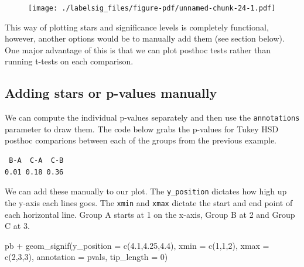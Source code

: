 \documentclass[
  letterpaper,
  DIV=11,
  numbers=noendperiod]{scrreprt}
\newenvironment{Shaded}{\begin{snugshade}}{\end{snugshade}}
\newcommand{\AttributeTok}[1]{\textcolor[rgb]{0.40,0.45,0.13}{#1}}
\newcommand{\DecValTok}[1]{\textcolor[rgb]{0.68,0.00,0.00}{#1}}
\newcommand{\FloatTok}[1]{\textcolor[rgb]{0.68,0.00,0.00}{#1}}
\newcommand{\FunctionTok}[1]{\textcolor[rgb]{0.28,0.35,0.67}{#1}}
\newcommand{\NormalTok}[1]{\textcolor[rgb]{0.00,0.23,0.31}{#1}}
\newcommand{\OtherTok}[1]{\textcolor[rgb]{0.00,0.23,0.31}{#1}}
\newcommand{\SpecialCharTok}[1]{\textcolor[rgb]{0.37,0.37,0.37}{#1}}
\begin{document}
\begin{figure}[H]

{\centering \texttt{[image: ./labelsig\_files/figure-pdf/unnamed-chunk-24-1.pdf]}

}

\end{figure}

This way of plotting stars and significance levels is completely
functional, however, another options would be to manually add them (see
section below). One major advantage of this is that we can plot posthoc
tests rather than running t-tests on each comparison.

\hypertarget{adding-stars-or-p-values-manually}{%
\subsection{\texorpdfstring{\textbf{Adding stars or p-values
manually}}{Adding stars or p-values manually}}\label{adding-stars-or-p-values-manually}}

We can compute the individual p-values separately and then use the
\texttt{annotations} parameter to draw them. The code below grabs the
p-values for Tukey HSD posthoc comparions between each of the groups
from the previous example.

\begin{Shaded}
\end{Shaded}

\begin{verbatim}
 B-A  C-A  C-B 
0.01 0.18 0.36 
\end{verbatim}

We can add these manually to our plot. The \texttt{y\_position} dictates
how high up the y-axis each lines goes. The \texttt{xmin} and
\texttt{xmax} dictate the start and end point of each horizontal line.
Group A starts at 1 on the x-axis, Group B at 2 and Group C at 3.

\begin{Shaded}
\begin{Highlighting}[]
\NormalTok{pb }\SpecialCharTok{+} 
  \FunctionTok{geom\_signif}\NormalTok{(}\AttributeTok{y\_position =} \FunctionTok{c}\NormalTok{(}\FloatTok{4.1}\NormalTok{,}\FloatTok{4.25}\NormalTok{,}\FloatTok{4.4}\NormalTok{), }
              \AttributeTok{xmin =} \FunctionTok{c}\NormalTok{(}\DecValTok{1}\NormalTok{,}\DecValTok{1}\NormalTok{,}\DecValTok{2}\NormalTok{), }
              \AttributeTok{xmax =} \FunctionTok{c}\NormalTok{(}\DecValTok{2}\NormalTok{,}\DecValTok{3}\NormalTok{,}\DecValTok{3}\NormalTok{), }
              \AttributeTok{annotation =}\NormalTok{ pvals,}
              \AttributeTok{tip\_length =} \DecValTok{0}\NormalTok{) }
\end{Highlighting}
\end{Shaded}
\end{document}

